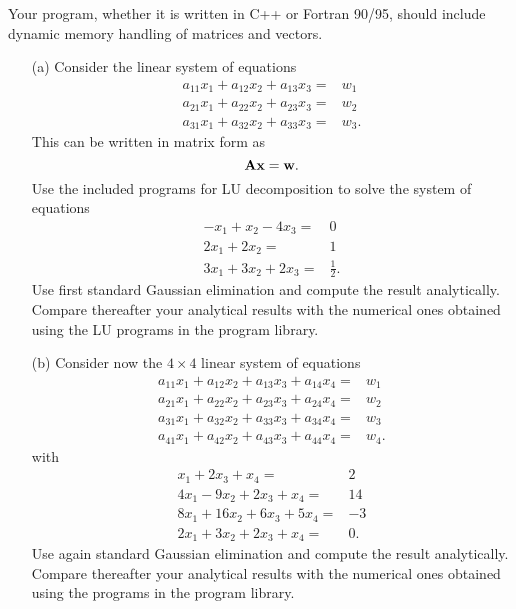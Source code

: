 Your program, whether it is written in C++ or Fortran 90/95, should include
dynamic memory handling of matrices and vectors. 
\begin{enumerate}
\item[(a)] 
Consider the linear system of equations 
%
\begin{eqnarray}
 a_{11}x_1 +a_{12}x_2 +a_{13}x_3 =&w_1 \nonumber \\
a_{21}x_1 + a_{22}x_2 + a_{23}x_3=&w_2 \nonumber \\
a_{31}x_1 + a_{32}x_2 + a_{33}x_3=&w_3. \nonumber 
\end{eqnarray}
This can be written in matrix form as
\[
   {\bf Ax}={\bf w}.
\]
Use the included programs for LU decomposition to solve the system of equations
\begin{eqnarray}
 -x_1 +x_2 -4x_3 =&0 \nonumber \\
  2x_1 + 2x_2 =&1 \nonumber \\
3x_1 + 3x_2 + 2x_3=&\frac{1}{2}. \nonumber 
\end{eqnarray}
Use first standard Gaussian elimination and compute the result
analytically. Compare thereafter your analytical results with
the numerical ones obtained using the LU programs in the program library.

\item[(b)] 
Consider now the $4\times 4$ linear system of equations 
%
\begin{eqnarray}
a_{11}x_1 +a_{12}x_2 +a_{13}x_3 + a_{14}x_4=&w_1 \nonumber \\
a_{21}x_1 + a_{22}x_2 + a_{23}x_3 + a_{24}x_4=&w_2 \nonumber \\
a_{31}x_1 + a_{32}x_2 + a_{33}x_3 + a_{34}x_4=&w_3 \nonumber \\
a_{41}x_1 + a_{42}x_2 + a_{43}x_3 + a_{44}x_4=&w_4. \nonumber
\end{eqnarray}
with 
\begin{eqnarray}
 x_1 +2x_3 +x_4 =&2 \nonumber \\
4x_1 -9x_2 + 2x_3 + x_4=&14 \nonumber \\
8x_1 + 16x_2 + 6x_3 + 5x_4=&-3 \nonumber \\
2x_1 + 3x_2 + 2x_3 + x_4=&0. \nonumber
\end{eqnarray}
Use again standard Gaussian elimination and compute the result
analytically. Compare thereafter your analytical results with
the numerical ones obtained using the programs in the program library.



\end{enumerate}
